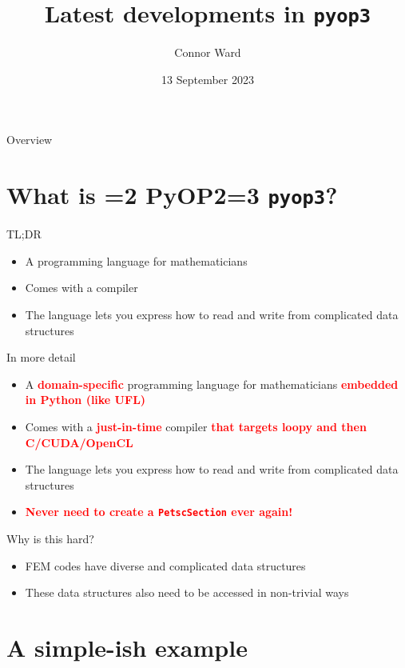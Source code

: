 \documentclass[aspectratio=169]{beamer}
\title{Latest developments in \texttt{pyop3}}
\author{Connor Ward}
\date{13 September 2023}
\def\pyop#1{\ifnum#1=2 {PyOP2}\else \ifnum#1=3 {\texttt{pyop3}}\fi \fi}
\newcommand{\myred}[1]{\textcolor{red}{\textbf{#1}}}
\begin{document}
\frame{\titlepage}

\begin{frame}{Overview}
  \tableofcontents
\end{frame}

\section{What is \pyop3?}

\begin{frame}{TL;DR}
  \begin{itemize}
    \item A programming language for mathematicians
    \item Comes with a compiler
    \item The language lets you express how to read and write from complicated data structures
  \end{itemize}

  \vfill
\end{frame}

\begin{frame}{In more detail}
  \begin{itemize}
    \item A \myred{domain-specific} programming language for mathematicians \myred{embedded in Python (like UFL)}
    \item Comes with a \myred{just-in-time} compiler \myred{that targets loopy and then C/CUDA/OpenCL}
    \item The language lets you express how to read and write from complicated data structures
    \item \myred{Never need to create a \texttt{PetscSection} ever again!}
  \end{itemize}

  \vfill
\end{frame}

\begin{frame}{Why is this hard?}
  \begin{itemize}
    \item FEM codes have diverse and complicated data structures
    \item These data structures also need to be accessed in non-trivial ways
  \end{itemize}
\end{frame}

\section{A simple-ish example}
\end{document}
